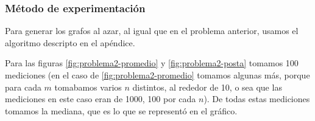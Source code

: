 \subsubsection{M\'etodo de experimentación}

Para generar los grafos al azar, al igual que en el problema anterior, usamos el algoritmo descripto en el apéndice.

Para las figuras \ref{fig:problema2-promedio} y \ref{fig:problema2-posta} tomamos 100 mediciones (en el caso de \ref{fig:problema2-promedio} tomamos algunas más, porque para cada $m$ tomabamos varios $n$ distintos, al rededor de 10, o sea que las mediciones en este caso eran de 1000, 100 por cada $n$). De todas estas mediciones tomamos la mediana, que es lo que se representó en el gráfico.

